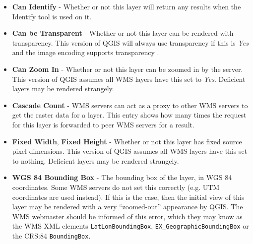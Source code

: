 \begin{itemize}
\begin{itemize}
\item \textbf{Can Identify}     - Whether or not this layer will return any results
                                  when the Identify tool is used on it.

\item \textbf{Can be Transparent} - Whether or not this layer can be rendered with transparency.
                                    This version of 
                                    QGIS will always use transparency if this is \textsl{Yes}
                                    and the image encoding supports transparency
                                    .

\item \textbf{Can Zoom In}      - Whether or not this layer can be zoomed in by the server.  This version
                                  of QGIS assumes all WMS layers have this set to \textsl{Yes}.
                                  Deficient layers may be rendered strangely.

\item \textbf{Cascade Count}    - WMS servers can act as a proxy to other WMS servers to get
                                  the raster data for a layer.  This entry shows how
                                  many times the request for this layer is forwarded to peer
                                  WMS servers for a result.

\item \textbf{Fixed Width}, \textbf{Fixed Height}
                                - Whether or not this layer has fixed source pixel dimensions.
                                  This version
                                  of QGIS assumes all WMS layers have this set to nothing.
                                  Deficient layers may be rendered strangely.

\item \textbf{WGS 84 Bounding Box} - The bounding box of the layer, in WGS 84 coordinates.
                                     Some WMS servers do not set this correctly (e.g. UTM
                                     coordinates are used instead).  If this is the case,
                                     then the initial view of this layer may be rendered
                                     with a very ``zoomed-out'' appearance by QGIS.
                                     The WMS webmaster should be informed of this error,
                                     which they may know as the WMS XML elements
                                     \texttt{LatLonBoundingBox},
                                     \texttt{EX\_GeographicBoundingBox} or
                                     the CRS:84 \texttt{BoundingBox}.


\end{itemize}
\end{itemize}
